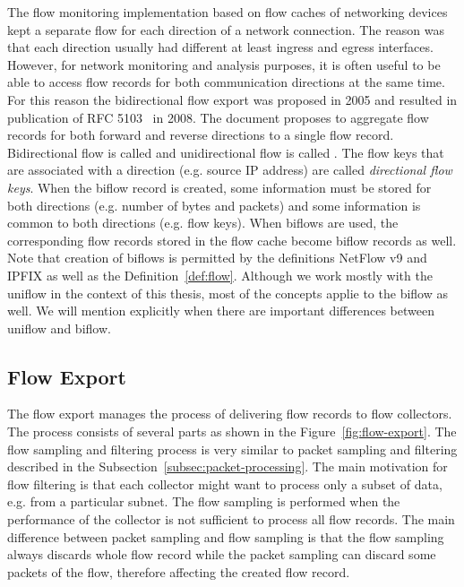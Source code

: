The flow monitoring implementation based on flow caches of networking devices kept a separate flow for each direction of a network connection. The reason was that each direction usually had different at least  ingress and egress interfaces. However, for network monitoring and analysis purposes, it is often useful to be able to access flow records for both communication directions at the same time. For this reason the bidirectional flow export was proposed in 2005 and resulted in publication of RFC 5103~\cite{rfc5103} in 2008. The document proposes to aggregate flow records for both forward and reverse directions to a single flow record. Bidirectional flow is called \emph{} and unidirectional flow is called \emph{}. The flow keys that are associated with a direction (e.g. source IP address) are called \emph{directional flow keys}. When the biflow record is created, some information must be stored for both directions (e.g. number of bytes and packets) and some information is common to both directions (e.g. flow keys). When biflows are used, the corresponding flow records stored in the flow cache become biflow records as well. Note that creation of biflows is permitted by the definitions NetFlow v9 and IPFIX as well as the Definition~\ref{def:flow}. Although we work mostly with the uniflow in the context of this thesis, most of the concepts applie to the biflow as well. We will mention explicitly when there are important differences between uniflow and biflow.

\subsection{Flow Export}

The flow export manages the process of delivering flow records to flow collectors. The process consists of several parts as shown in the Figure~\ref{fig:flow-export}. The flow sampling and filtering process is very similar to packet sampling and filtering described in the Subsection~\ref{subsec:packet-processing}. The main motivation for flow filtering is that each collector might want to process only a subset of data, e.g. from a particular subnet. The flow sampling is performed when the performance of the collector is not sufficient to process all flow records. The main difference between packet sampling and flow sampling is that the flow sampling always discards whole flow record while the packet sampling can discard some packets of the flow, therefore affecting the created flow record. 

